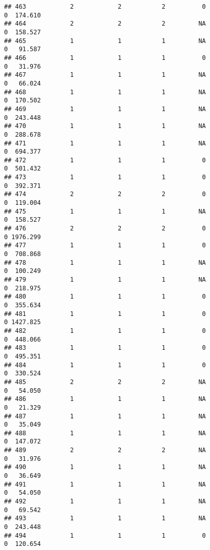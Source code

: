 \documentclass[
]{article}
\begin{document}
\begin{verbatim}
## 463            2            2           2          0                0  174.610
## 464            2            2           2         NA                0  158.527
## 465            1            1           1         NA                0   91.587
## 466            1            1           1          0                0   31.976
## 467            1            1           1         NA                0   66.024
## 468            1            1           1         NA                0  170.502
## 469            1            1           1         NA                0  243.448
## 470            1            1           1         NA                0  288.678
## 471            1            1           1         NA                0  694.377
## 472            1            1           1          0                0  501.432
## 473            1            1           1          0                0  392.371
## 474            2            2           2          0                0  119.004
## 475            1            1           1         NA                0  158.527
## 476            2            2           2          0                0 1976.299
## 477            1            1           1          0                0  708.868
## 478            1            1           1         NA                0  100.249
## 479            1            1           1         NA                0  218.975
## 480            1            1           1          0                0  355.634
## 481            1            1           1          0                0 1427.825
## 482            1            1           1          0                0  448.066
## 483            1            1           1          0                0  495.351
## 484            1            1           1          0                0  330.524
## 485            2            2           2         NA                0   54.050
## 486            1            1           1         NA                0   21.329
## 487            1            1           1         NA                0   35.049
## 488            1            1           1         NA                0  147.072
## 489            2            2           2         NA                0   31.976
## 490            1            1           1         NA                0   36.649
## 491            1            1           1         NA                0   54.050
## 492            1            1           1         NA                0   69.542
## 493            1            1           1         NA                0  243.448
## 494            1            1           1          0                0  120.654

\end{verbatim}
\end{document}
